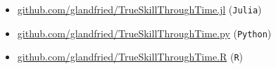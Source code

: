 \documentclass[a4paper,10pt]{book}
\theoremstyle{definition}
\newif\ifen
\newif\ifes
\newcommand{\en}[1]{\ifen#1\fi}
\newcommand{\es}[1]{\ifes#1\fi}
\begin{document}
\en{The source codes for the TrueSkill Through Time packages can be found at:}
\es{Los c\'odigos fuentes de los paquetes TrueSkill Through Time se encuentran en:}
\begin{itemize}
\item \href{github.com/glandfried/TrueSkillThroughTime.jl}{\url{github.com/glandfried/TrueSkillThroughTime.jl}} (\texttt{Julia})
\item \href{github.com/glandfried/TrueSkillThroughTime.py}{\url{github.com/glandfried/TrueSkillThroughTime.py}}  (\texttt{Python})
\item \href{github.com/glandfried/TrueSkillThroughTime.R}{\url{github.com/glandfried/TrueSkillThroughTime.R}}  (\texttt{R})
\end{itemize}
% 
% 
% 
% 
%  
% 
\end{document}
